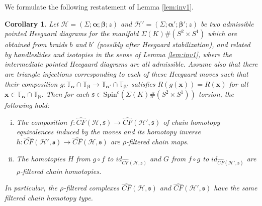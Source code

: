 \documentclass[11pt]{article}
\theoremstyle{plain} \newtheorem{thm}{Theorem}[subsection]
\theoremstyle{plain} \newtheorem{cor}[thm]{Corollary}
\theoremstyle{plain} \newtheorem{prop}[thm]{Proposition}
\theoremstyle{plain} \newtheorem{conj}[thm]{Conjecture}
\theoremstyle{plain} \newtheorem{lem}[thm]{Lemma}
\theoremstyle{definition} \newtheorem{df}[thm]{Definition}
\theoremstyle{remark} \newtheorem{rmk}[thm]{Remark}
\theoremstyle{remark} \newtheorem{obs}[thm]{Observation}
\newcommand{\DBCs}[1]{\Sigma(#1)\#(S^{2}\times S^{1})}
\newcommand{\h}{\mathcal{H}}
\newcommand{\Scx}[1]{\text{Spin}^{c}(\DBCs{#1})}
\newcommand{\ba}{\boldsymbol{\alpha}}
\newcommand{\bb}{\boldsymbol{\beta}}
\newcommand{\bx}{\mathbf{x}}
\newcommand{\thet}[1]{\boldsymbol{\theta}_{#1}}
\newcommand{\tor}[1]{\mathbb{T}_{#1}}
\newcommand{\AD}{\nabla}
\begin{document}
We formulate the following restatement of Lemma \ref{lem:inv1}.

\begin{cor}\label{cor:tri3}
Let $\h = \left(\Sigma; \ba; \bb; z\right)$ and $\h' = \left(\Sigma; \ba'; \bb'; z\right)$ be two admissible pointed Heegaard diagrams for the manifold $\DBCs{K}$ which are obtained from braids $b$ and $b'$ (possibly after Heegaard stabilization), and related by handleslides and isotopies in the sense of Lemma \ref{lem:inv1}, where the intermediate pointed Heegaard diagrams are all admissible.  Assume also that there are  triangle injections corresponding to each of these Heegaard moves such that their composition $g: \tor{\ba} \cap \tor{\bb} \rightarrow \tor{\ba'} \cap \tor{\bb'}$ satisfies $R(g(\bx)) = R(\bx)$ for all $\bx \in \tor{\ba} \cap \tor{\bb}$.
Then for each $\mathfrak{s} \in \Scx{K}$ torsion, the following hold:
\begin{enumerate}[(i)]
\item The composition $f: \widehat{CF}(\h, \mathfrak{s}) \rightarrow \widehat{CF}(\h', \mathfrak{s})$ of chain homotopy equivalences induced by the moves and its homotopy inverse $h: \widehat{CF}(\h', \mathfrak{s}) \rightarrow \widehat{CF}(\h, \mathfrak{s})$ are $\rho$-filtered chain maps.
\item The homotopies $H$ from $g \circ f$ to $id_{\widehat{CF}(\h, \mathfrak{s})}$ and $G$ from $f \circ g$ to $id_{\widehat{CF}(\h', \mathfrak{s})}$ are $\rho$-filtered chain homotopies.
\end{enumerate}
In particular, the $\rho$-filtered complexes $\widehat{CF}(\h, \mathfrak{s})$ and $\widehat{CF}(\h', \mathfrak{s})$ have the same filtered chain homotopy type.
\end{cor}

\end{document}
